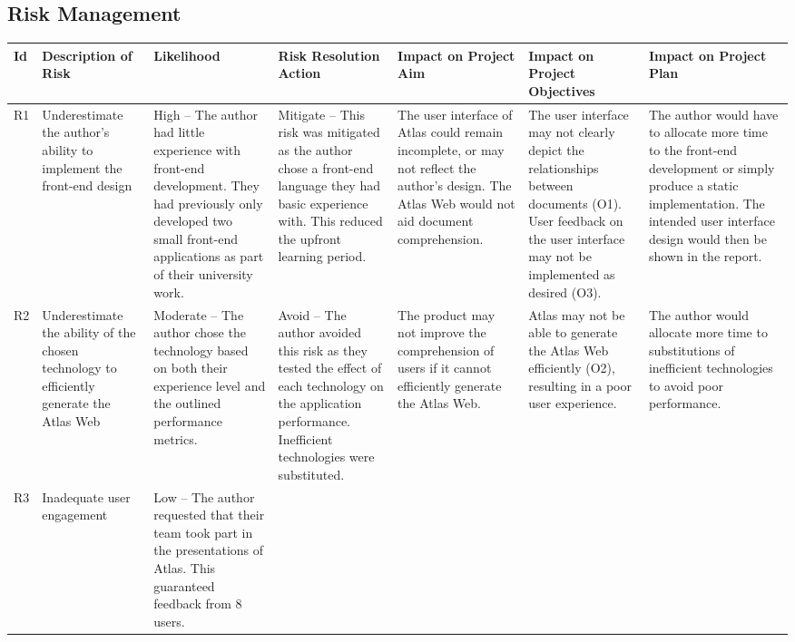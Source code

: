 \documentclass{article}
\begin{document}
\begin{landscape}

\section{Risk Management}
\singlespacing

\begin{longtable}{|p{0.6cm}|p{2cm}|p{3.3cm}|p{3.3cm}|p{3cm}|p{3.5cm}|p{3.3cm}|}
\hline
\textbf{Id} &
  \textbf{Description of Risk} &
  \textbf{Likelihood} &
  \textbf{Risk Resolution Action} &
  \textbf{Impact on Project Aim} &
  \textbf{Impact on Project Objectives} &
  \textbf{Impact on Project Plan} \\ \hline
\endhead
%
\rowcolor[HTML]{FF7E79} 
R1 &
  Underestimate the author's ability to implement the front-end design &
  High – The author had little experience with front-end development. They had previously   only developed two small front-end applications as part of their university work. &
  Mitigate – This risk was mitigated as the author chose a front-end language they had basic   experience with. This reduced the upfront learning period. &
  The user interface of Atlas could remain incomplete, or may not reflect the author's   design. The Atlas Web would not aid document comprehension. &
  The user interface may not clearly depict the relationships between documents (O1). User   feedback on the user interface may not be implemented as desired (O3). &
  The author would have to allocate more time to the front-end development or simply produce a static implementation. The intended user interface design would then be shown in the report. \\ \hline
\rowcolor[HTML]{FFC000} 
R2 &
  Underestimate the ability of the chosen technology to efficiently generate the Atlas Web &
  Moderate – The author chose the technology based on both their experience level and the outlined performance metrics. &
  Avoid – The author avoided this risk as they tested the effect of each technology on the application performance. Inefficient technologies were substituted. &
  The product may not improve the comprehension of users if it cannot efficiently generate the   Atlas Web. &
  Atlas may not be able to generate the Atlas Web efficiently (O2), resulting in a poor user experience. &
  The author would allocate more time to substitutions of inefficient technologies to   avoid poor performance. \\ \hline
\rowcolor[HTML]{92D050} 
R3 &
  Inadequate user engagement &
  Low – The author requested that their team took part in the presentations of Atlas. This guaranteed feedback from 8 users. &

\end{longtable}
\end{landscape}
\end{document}
